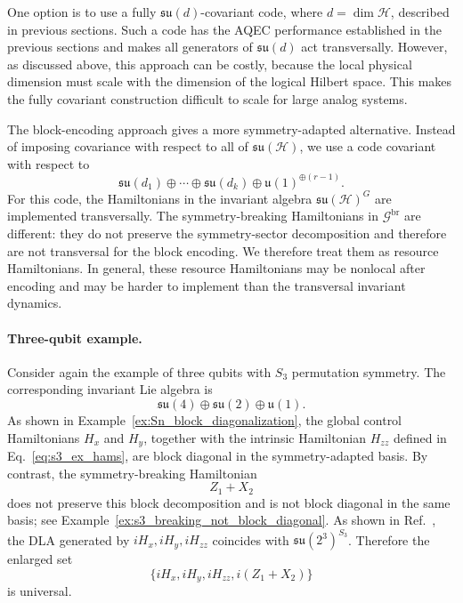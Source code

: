 \documentclass[10pt,twocolumn,superscriptaddress,aps,amsmath,amssymb,citeautoscript,floatfix,prx]{revtex4-2}
\newcounter{alg}
\theoremstyle{plain}
\theoremstyle{plain}
\theoremstyle{plain}
\theoremstyle{plain}
\theoremstyle{plain}
\theoremstyle{plain}
\theoremstyle{plain}
\theoremstyle{definition}
\theoremstyle{plain}
\begin{document}
One option is to use a fully $\mathfrak{su}(d)$-covariant code, where $d=\dim\mathcal H$, described in previous sections. 
Such a code has the AQEC performance established in the previous sections and makes all generators of $\mathfrak{su}(d)$ act transversally. 
However, as discussed above, this approach can be costly, because the local physical dimension must scale with the dimension of the logical Hilbert space. 
This makes the fully covariant construction difficult to scale for large analog systems.

The block-encoding approach gives a more symmetry-adapted alternative. 
Instead of imposing covariance with respect to all of $\mathfrak{su}(\mathcal H)$, we use a code covariant with respect to
$$
\mathfrak{su}(d_1)
\oplus
\cdots
\oplus
\mathfrak{su}(d_k)
\oplus
\mathfrak{u}(1)^{\oplus(r-1)} .
$$
For this code, the Hamiltonians in the invariant algebra $\mathfrak{su}(\mathcal H)^G$ are implemented transversally. 
The symmetry-breaking Hamiltonians in $\mathcal G^{\mathrm{br}}$ are different: 
they do not preserve the symmetry-sector decomposition and therefore are not transversal for the block encoding. We therefore treat them as resource Hamiltonians. 
In general, these resource Hamiltonians may be nonlocal after encoding and may be harder to implement than the transversal invariant dynamics.

\paragraph{Three-qubit example.}

Consider again the example of three qubits with $S_3$ permutation symmetry. The corresponding invariant Lie algebra is
$$
\mathfrak{su}(4)
\oplus
\mathfrak{su}(2)
\oplus
\mathfrak{u}(1).
$$
As shown in Example~\ref{ex:Sn_block_diagonalization}, the global control Hamiltonians $H_x$ and $H_y$, together with the intrinsic Hamiltonian $H_{zz}$ defined 
in Eq.~\eqref{eq:s3_ex_hams}, are block diagonal in the symmetry-adapted basis. By contrast, the symmetry-breaking Hamiltonian
$$
Z_1+X_2
$$
does not preserve this block decomposition and is not block diagonal in the same basis; see Example~\ref{ex:s3_breaking_not_block_diagonal}. 
As shown in Ref.~\cite{Albertini2018}, the DLA generated by ${iH_x,iH_y,iH_{zz}}$ coincides with $\mathfrak{su}(2^3)^{S_3}$. Therefore the enlarged set
$$
\{iH_x,iH_y,iH_{zz},i(Z_1+X_2)\}
$$
is universal.
\end{document}
